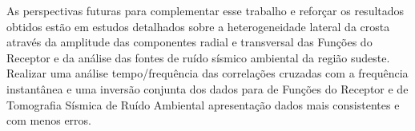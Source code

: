 As perspectivas futuras para complementar esse trabalho e reforçar os resultados obtidos estão em estudos detalhados sobre a heterogeneidade lateral da crosta através da amplitude das componentes radial e transversal das Funções do Receptor e da análise das fontes de ruído sísmico ambiental da região sudeste. Realizar uma análise tempo/frequência das correlações cruzadas com a frequência instantânea e uma inversão conjunta dos dados para de Funções do Receptor e de Tomografia Sísmica de Ruído Ambiental apresentação dados mais consistentes e com menos erros.